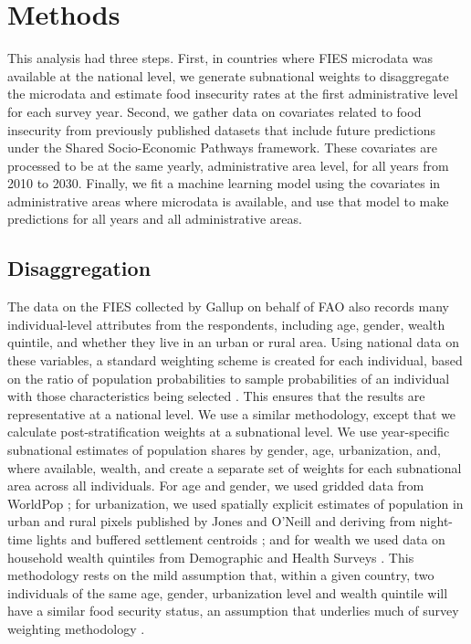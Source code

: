 \documentclass[titlepage]{article}
\begin{document}
\section{Methods}
This analysis had three steps.  First, in countries where FIES microdata was available at the national level, we generate subnational weights to disaggregate the microdata and estimate food insecurity rates at the first administrative level for each survey year.  Second, we gather data on covariates related to food insecurity from previously published datasets that include future predictions under the Shared Socio-Economic Pathways framework.  These covariates are processed to be at the same yearly, administrative area level, for all years from 2010 to 2030.  Finally, we fit a machine learning model using the covariates in administrative areas where microdata is available, and use that model to make predictions for all years and all administrative areas.

\subsection{Disaggregation}
The data on the FIES collected by Gallup on behalf of FAO also records many individual-level attributes from the respondents, including age, gender, wealth quintile, and whether they live in an urban or rural area.  Using national data on these variables, a standard weighting scheme is created for each individual, based on the ratio of population probabilities to sample probabilities of an individual with those characteristics being selected \citep{bethlehem2009applied}.  This ensures that the results are representative at a national level.  We use a similar methodology, except that we calculate post-stratification weights at a subnational level.  We use year-specific subnational estimates of population shares by gender, age, urbanization, and, where available, wealth, and create a separate set of weights for each subnational area across all individuals.  For age and gender, we used gridded data from WorldPop \citep{Tatem2017}; for urbanization, we used spatially explicit estimates of population in urban and rural pixels published by Jones and O'Neill and deriving from night-time lights and buffered settlement centroids \citep{Jones2016}; and for wealth we used data on household wealth quintiles from Demographic and Health Surveys \citep{dhsall}.  This methodology rests on the mild assumption that, within a given country, two individuals of the same age, gender, urbanization level and wealth quintile will have a similar food security status, an assumption that underlies much of survey weighting methodology \citep{bethlehem2009applied}.
\end{document}
